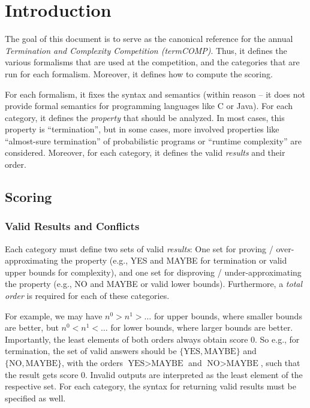\chapter{Introduction}
\label{chap:intro}

The goal of this document is to serve as the canonical reference for the annual \emph{Termination and Complexity Competition (termCOMP)}.
%
Thus, it defines the various formalisms that are used at the competition, and the categories that are run for each formalism.
%
Moreover, it defines how to compute the scoring.

For each formalism, it fixes the syntax and semantics (within reason -- it does not provide formal semantics for programming languages like C or Java).
%
For each category, it defines the \emph{property} that should be analyzed.
%
In most cases, this property is ``termination'', but in some cases, more involved properties like ``almost-sure termination'' of probabilistic programs or ``runtime complexity'' are considered.
%
Moreover, for each category, it defines the valid \emph{results} and their order.

\section{Scoring}
\label{sec:scoring}

\subsection{Valid Results and Conflicts}

Each category must define two sets of valid \emph{results}: One set for proving / over-approximating the property (e.g., YES and MAYBE for termination or valid upper bounds for complexity), and one set for disproving / under-approximating the property (e.g., NO and MAYBE or valid lower bounds).
%
Furthermore, a \emph{total order} is required for each of these categories.

For example, we may have $n^0 > n^1 > \ldots$ for upper bounds, where smaller bounds are better, but $n^0 < n^1 < \ldots$ for lower bounds, where larger bounds are better.
%
Importantly, the least elements of both orders always obtain score $0$.
%
So e.g., for termination, the set of valid answers should be $\{\text{YES}, \text{MAYBE}\}$ and $\{\text{NO}, \text{MAYBE}\}$, with the orders $\text{YES} > \text{MAYBE}$ and $\text{NO} > \text{MAYBE}$, such that the result  gets score $0$.
%
Invalid outputs are interpreted as the least element of the respective set.
%
For each category, the syntax for returning valid results must be specified as well.

